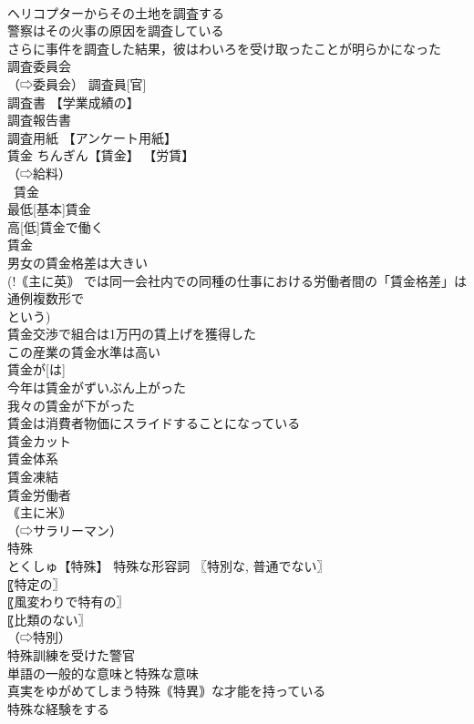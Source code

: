 \documentclass[8pt]{extreport}
\begin{document}
\begin{CJK}{UTF8}{min}
\\	ヘリコプターからその土地を調査する 
\\	警察はその火事の原因を調査している 
\\	さらに事件を調査した結果，彼はわいろを受け取ったことが明らかになった 
\\	調査委員会 
\\	（⇨委員会） 調査員[官] 
\\	調査書 【学業成績の】
\\	調査報告書 
\\	調査用紙 【アンケート用紙】
\\	賃金		ちんぎん【賃金】 【労賃】
\\	（⇨給料） 
\\	~賃金 
\\	最低[基本]賃金 
\\	高[低]賃金で働く 
\\	賃金~ 
\\	男女の賃金格差は大きい 
\\	(!｟主に英｠ では同一会社内での同種の仕事における労働者間の「賃金格差」は通例複数形で 
\\	という) 
\\	賃金交渉で組合は1万円の賃上げを獲得した 
\\	この産業の賃金水準は高い 
\\	賃金が[は] 
\\	今年は賃金がずいぶん上がった 
\\	我々の賃金が下がった 
\\	賃金は消費者物価にスライドすることになっている 
\\	賃金カット 
\\	賃金体系 
\\	賃金凍結 
\\	賃金労働者 
\\	｟主に米｠
\\	（⇨サラリーマン）
\\	特殊		
\\	とくしゅ【特殊】 特殊な形容詞 〖特別な, 普通でない〗
\\	〖特定の〗
\\	〖風変わりで特有の〗
\\	〖比類のない〗
\\	（⇨特別） 
\\	特殊訓練を受けた警官 
\\	単語の一般的な意味と特殊な意味 
\\	真実をゆがめてしまう特殊｟特異｠な才能を持っている 
\\	特殊な経験をする 

\end{CJK}
\end{document}
